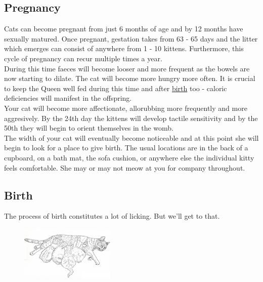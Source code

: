 \documentclass{article}
\begin{document}
\subsection*{Pregnancy}
Cats can become pregnant from just 6 months of age and by 12 months have sexually matured. Once pregnant, \gls{gestation} takes from 63 - 65 days and the litter which emerges can consist of anywhere from 1 - 10 kittens. Furthermore, this cycle of pregnancy can recur multiple times a year.\\

During this time faeces will become looser and more frequent as the bowels are now starting to dilate. The cat will become more hungry more often. It is crucial to keep the Queen well fed during this time and after \hyperref[sec:Birth]{birth} too - caloric deficiencies will manifest in the offspring.\\

Your cat will become more affectionate, allorubbing more frequently and more aggresively. By the 24th day the kittens will develop tactile sensitivity and by the 50th they will begin to orient themselves in the womb.\\

The width of your cat will eventually become noticeable and at this point she will begin to look for a place to give birth. The usual locations are in the back of a cupboard, on a bath mat, the sofa cushion, or anywhere else the individual kitty feels comfortable. She may or may not meow at you for company throughout.

\subsection*{Birth}
\label{sec:Birth}

\fancyfoot[L,R]{}

The process of birth constitutes a lot of licking. But we'll get to that.\\
\begin{figure}
    \centering
    \includegraphics[width=0.4\textwidth]{img/cat-mum.png}
\end{figure}
\end{document}
